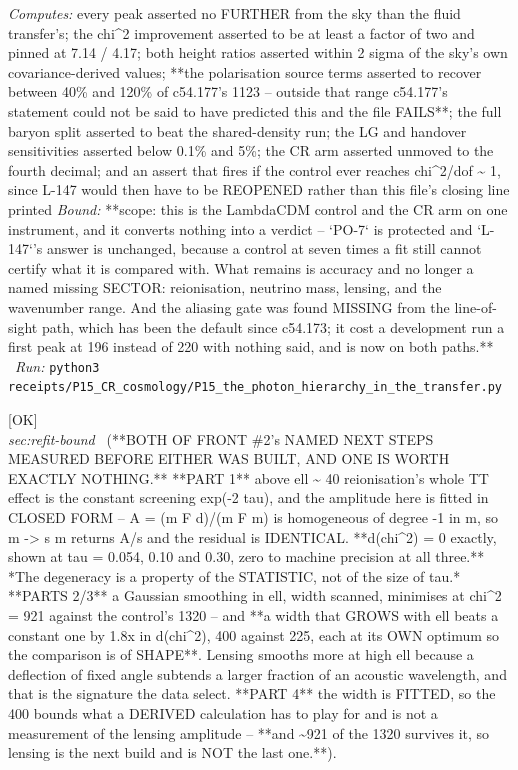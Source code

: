\begin{description}
\emph{Computes:} every peak asserted no FURTHER from the sky than the fluid transfer's; the chi\textasciicircum{}2 improvement asserted to be at least a factor of two and pinned at 7.14 / 4.17; both height ratios asserted within 2 sigma of the sky's own covariance-derived values; **the polarisation source terms asserted to recover between 40\% and 120\% of c54.177's 1123 -- outside that range c54.177's statement could not be said to have predicted this and the file FAILS**; the full baryon split asserted to beat the shared-density run; the LG and handover sensitivities asserted below 0.1\% and 5\%; the CR arm asserted unmoved to the fourth decimal; and an assert that fires if the control ever reaches chi\textasciicircum{}2/dof \textasciitilde{} 1, since L-147 would then have to be REOPENED rather than this file's closing line printed
 \emph{Bound:} **scope: this is the LambdaCDM control and the CR arm on one instrument, and it converts nothing into a verdict -- `PO-7` is protected and `L-147`'s answer is unchanged, because a control at seven times a fit still cannot certify what it is compared with. What remains is accuracy and no longer a named missing SECTOR: reionisation, neutrino mass, lensing, and the wavenumber range. And the aliasing gate was found MISSING from the line-of-sight path, which has been the default since c54.173; it cost a development run a first peak at 196 instead of 220 with nothing said, and is now on both paths.**
\ \emph{Run:} \texttt{python3 receipts/P15\_CR\_cosmology/P15\_the\_photon\_hierarchy\_in\_the\_transfer.py}
\item[\rcptlabel{P15_what_is_left_is_lensing_and_not_reionisation}{P15R73}\textbf{P15R73}\quad\texttt{P15\_what\_is\_left\_is\_lensing\_and\_not\_reionisation}]\hfill\textsf{[OK]}\\
\textit{sec:refit-bound} \ (**BOTH OF FRONT \#2's NAMED NEXT STEPS MEASURED BEFORE EITHER WAS BUILT, AND ONE IS WORTH EXACTLY NOTHING.** **PART 1** above ell \textasciitilde{} 40 reionisation's whole TT effect is the constant screening exp(-2 tau), and the amplitude here is fitted in CLOSED FORM -- A = (m F d)/(m F m) is homogeneous of degree -1 in m, so m -> s m returns A/s and the residual is IDENTICAL. **d(chi\textasciicircum{}2) = 0 exactly, shown at tau = 0.054, 0.10 and 0.30, zero to machine precision at all three.** *The degeneracy is a property of the STATISTIC, not of the size of tau.* **PARTS 2/3** a Gaussian smoothing in ell, width scanned, minimises at chi\textasciicircum{}2 = 921 against the control's 1320 -- and **a width that GROWS with ell beats a constant one by 1.8x in d(chi\textasciicircum{}2), 400 against 225, each at its OWN optimum so the comparison is of SHAPE**. Lensing smooths more at high ell because a deflection of fixed angle subtends a larger fraction of an acoustic wavelength, and that is the signature the data select. **PART 4** the width is FITTED, so the 400 bounds what a DERIVED calculation has to play for and is not a measurement of the lensing amplitude -- **and \textasciitilde{}921 of the 1320 survives it, so lensing is the next build and is NOT the last one.**). 

\end{description}
